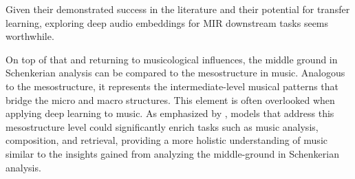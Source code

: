 Given their demonstrated success in the literature and their potential for transfer learning, exploring deep audio embeddings for MIR downstream tasks seems worthwhile.

On top of that and returning to musicological influences, the middle ground in Schenkerian analysis can be compared to the mesostructure in music. Analogous to the mesostructure, it represents the intermediate-level musical patterns that bridge the micro and macro structures. This element is often overlooked when applying deep learning to music. As emphasized by \cite{Mesostructures2023}, models that address this mesostructure level could significantly enrich tasks such as music analysis, composition, and retrieval, providing a more holistic understanding of music similar to the insights gained from analyzing the middle-ground in Schenkerian analysis. \cite{Introduction_to_Schenkerian_Analysis}
